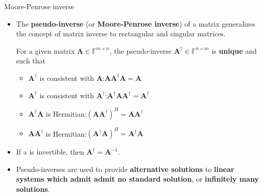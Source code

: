 \documentclass[t,usepdftitle=false]{beamer}
\begin{document}
\begin{frame}{Moore-Penrose inverse}
\begin{itemize}
\item The \textbf{pseudo-inverse} (or \textbf{Moore-Penrose inverse}) of a matrix generalizes the concept of matrix inverse to rectangular and singular matrices.
\begin{definition}
For a given matrix $\mathbf{A}\in\mathbb{F}^{m\times n}$, the pseudo-inverse $\mathbf{A}^\dagger\in\mathbb{F}^{n\times m}$ is \textbf{unique} and such that
\begin{itemize}
\item $\mathbf{A}^\dagger$ is consistent with $\mathbf{A}$:\hspace{1cm}$\mathbf{A}\mathbf{A}^\dagger\mathbf{A}=\mathbf{A}$
\item $\mathbf{A}^\dagger$ is consistent with $\mathbf{A}^\dagger$:\hspace{.85cm}$\mathbf{A}^\dagger\mathbf{A}\mathbf{A}^\dagger=\mathbf{A}^\dagger$
\item $\mathbf{A}^\dagger\mathbf{A}$ is Hermitian:\hspace{1.63cm}$(\mathbf{A}\mathbf{A}^\dagger)^H=\mathbf{A}\mathbf{A}^\dagger$
\item $\mathbf{A}\mathbf{A}^\dagger$ is Hermitian:\hspace{1.63cm}$(\mathbf{A}^\dagger\mathbf{A})^H=\mathbf{A}^\dagger\mathbf{A}$
\end{itemize}
\end{definition}
\item If a is invertible, then $\mathbf{A}^\dagger=\mathbf{A}^{-1}$.
\item Pseudo-inverses are used to provide \textbf{alternative solutions} to \textbf{linear systems which admit admit no standard solution}, or \textbf{infinitely many solutions}.
\end{itemize}
\end{frame}
\end{document}
